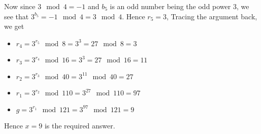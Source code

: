 \documentclass[12pt]{exam}
\theoremstyle{plain} %
\theoremstyle{definition} %
\theoremstyle{remark} %
\begin{document}
\begin{questions}
\begin{solution}
  Now since $3\mod 4 = -1$ and $b_5$ is an odd number being the odd power $3$, we see that $3^{b_5} = -1 \mod 4 = 3 \mod 4$. Hence $r_5 = 3$, Tracing the argument back, we get  \begin{itemize}[]
    \item  $r_4 = 3^{r_5} \mod 8 = 3^3 = 27 \mod 8 = 3$
    \item  $r_3 = 3^{r_4} \mod 16 = 3^3 = 27 \mod 16 = 11$
    \item  $r_2 = 3^{r_3} \mod 40 = 3^{11} \mod 40 = 27$
    \item  $r_1 = 3^{r_2} \mod 110 = 3^{27} \mod 110 = 97$
    \item  $g = 3^{r_1} \mod 121 = 3^{97} \mod 121 = 9$
  \end{itemize}

  Hence $x = 9$ is the required answer.


\end{solution}


\end{questions}
\end{document}
